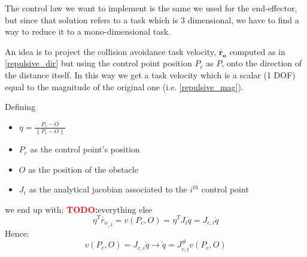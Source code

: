 \documentclass[12pt, a4paper]{article}
\newcommand{\todo}{\textcolor{red}{\textbf{TODO:}}}
\newcommand{\norm}[1]{\parallel{#1}\parallel}
\begin{document}
The control law we want to implement is the same we used for the end-effector, but since that solution refers to a task which is 3 dimensional, we have to find a way to reduce it to a mono-dimensional task.

An idea is to project the collision avoidance task velocity, $\mathbf{\dot{r_{o}}}$ computed as in \eqref{repulsive_dir} but using the control point position $P_c$ as $P$, onto the direction of the distance itself. In this way we get a task velocity which is a scalar (1 DOF) equal to the magnitude of the original one (i.e. \eqref{repulsive_mag}).

Defining 
\begin{itemize}
	\item $\eta = \frac{P_c - O}{\norm{P_c-O}}$
	\item $P_c$ as the control point's position
	\item $O$ as the position of the obstacle
	\item $J_i$ as the analytical jacobian associated to the $i^{th}$ control point
\end{itemize}
we end up with: \todo everything else
\begin{equation*}
\eta^T\dot{r_{o}}_{,i} = v(P_c,O) =\eta^T J_i\dot{q} = J_{c,i}\dot{q}
\end{equation*}
Hence:
\begin{equation}
v(P_c,O) = J_{c,i}\dot{q} \rightarrow \dot{q} = J_{c,i}^{\#}v(P_c,O)
\end{equation}

\end{document}
